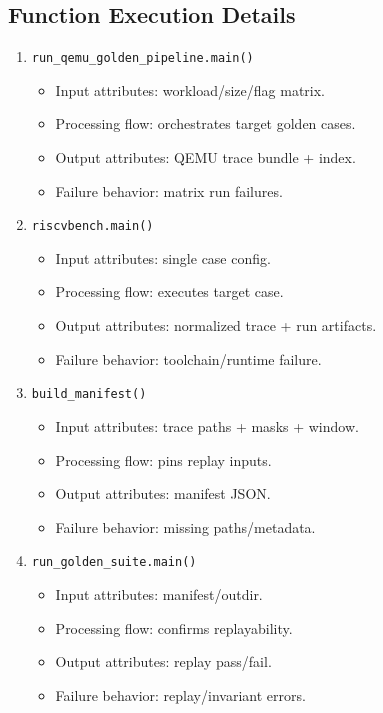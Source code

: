 \documentclass[11pt,a4paper]{article}
\begin{document}
\subsection*{Function Execution Details}
\begin{enumerate}[leftmargin=*]
  \item \texttt{run\_qemu\_golden\_pipeline.main()}
  \begin{itemize}[leftmargin=*]
    \item Input attributes: workload/size/flag matrix.
    \item Processing flow: orchestrates target golden cases.
    \item Output attributes: QEMU trace bundle + index.
    \item Failure behavior: matrix run failures.
  \end{itemize}
  \item \texttt{riscvbench.main()}
  \begin{itemize}[leftmargin=*]
    \item Input attributes: single case config.
    \item Processing flow: executes target case.
    \item Output attributes: normalized trace + run artifacts.
    \item Failure behavior: toolchain/runtime failure.
  \end{itemize}
  \item \texttt{build\_manifest()}
  \begin{itemize}[leftmargin=*]
    \item Input attributes: trace paths + masks + window.
    \item Processing flow: pins replay inputs.
    \item Output attributes: manifest JSON.
    \item Failure behavior: missing paths/metadata.
  \end{itemize}
  \item \texttt{run\_golden\_suite.main()}
  \begin{itemize}[leftmargin=*]
    \item Input attributes: manifest/outdir.
    \item Processing flow: confirms replayability.
    \item Output attributes: replay pass/fail.
    \item Failure behavior: replay/invariant errors.
  \end{itemize}
\end{enumerate}
\end{document}
